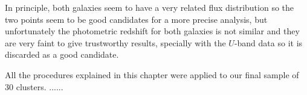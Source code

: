 In principle, both galaxies seem to have a very related flux distribution so the two points seem to be good candidates for a more precise analysis, but unfortunately the photometric redshift for both galaxies is not similar and they are very faint to give trustworthy results, specially with the $U$-band data so it is discarded as a good candidate.

All the procedures explained in this chapter were applied to our final sample of 30 clusters. ......